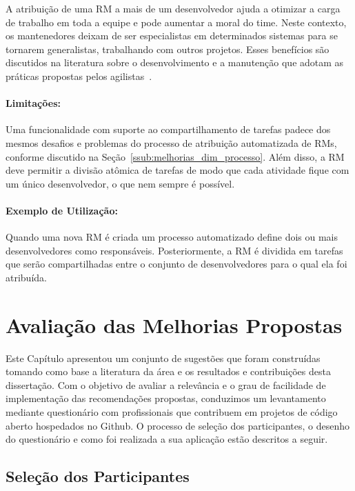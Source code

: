 A atribuição de uma RM a mais de um desenvolvedor ajuda a otimizar a carga de
trabalho em toda a equipe e pode aumentar a moral do time. Neste contexto, os
mantenedores deixam de ser especialistas em determinados sistemas para se
tornarem generalistas, trabalhando com outros projetos. Esses benefícios são
discutidos na literatura sobre o desenvolvimento e a manutenção que adotam as
práticas propostas pelos agilistas~\cite{dybaa2008empirical,rudzki2009agile}.

\paragraph{Limitações:}
\label{par:limitacoes_s08}

Uma funcionalidade com suporte ao compartilhamento de tarefas padece dos mesmos
desafios e problemas do processo de atribuição automatizada de RMs, conforme
discutido na Seção~\ref{ssub:melhorias_dim_processo}. Além disso, a RM deve
permitir a divisão atômica de tarefas de modo que cada atividade fique com um
único desenvolvedor, o que nem sempre é possível.

\paragraph{Exemplo de Utilização:}
\label{par:exemplo_de_utilização_s08}

Quando uma nova RM é criada um processo automatizado define dois ou mais
desenvolvedores como responsáveis. Posteriormente, a RM é dividida em tarefas
que serão compartilhadas entre o conjunto de desenvolvedores para o qual ela foi
atribuída.

\section{Avaliação das Melhorias Propostas}
\label{sec:sug_melhoria_avaliacao_das_melhorias}

Este Capítulo apresentou um conjunto de sugestões que foram construídas tomando
como base a literatura da área e os resultados e contribuições desta
dissertação. Com o objetivo de avaliar a relevância e o grau de facilidade de
implementação das recomendações propostas, conduzimos um levantamento mediante
questionário com profissionais que contribuem em projetos de código aberto
hospedados no Github. O processo de seleção dos participantes, o desenho do
questionário e como foi realizada a sua aplicação estão descritos a seguir.

\subsection{Seleção dos Participantes}
\label{ssub:sug_melhoria_selecao_participantes}

